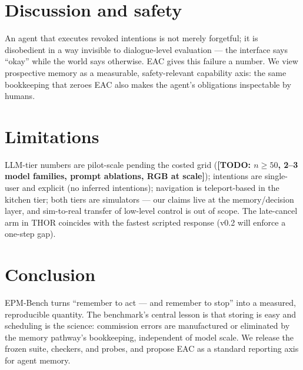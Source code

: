 \documentclass[10pt]{article}
\newcommand{\todo}[1]{\textbf{[TODO: #1]}}
\begin{document}
\section{Discussion and safety}
An agent that executes revoked intentions is not merely forgetful; it is
disobedient in a way invisible to dialogue-level evaluation --- the
interface says ``okay'' while the world says otherwise. EAC gives this
failure a number. We view prospective memory as a measurable,
safety-relevant capability axis: the same bookkeeping that zeroes EAC
also makes the agent's obligations inspectable by humans.

\section{Limitations}
LLM-tier numbers are pilot-scale pending the costed grid
(\todo{$n{\ge}50$, 2--3 model families, prompt ablations, RGB at
scale}); intentions are single-user and explicit (no inferred
intentions); navigation is teleport-based in the kitchen tier; both
tiers are simulators --- our claims live at the memory/decision layer,
and sim-to-real transfer of low-level control is out of scope. The
late-cancel arm in THOR coincides with the fastest scripted response
(v0.2 will enforce a one-step gap).

\section{Conclusion}
EPM-Bench turns ``remember to act --- and remember to stop'' into a
measured, reproducible quantity. The benchmark's central lesson is that
storing is easy and scheduling is the science: commission errors are
manufactured or eliminated by the memory pathway's bookkeeping,
independent of model scale. We release the frozen suite, checkers, and
probes, and propose EAC as a standard reporting axis for agent memory.
\end{document}
